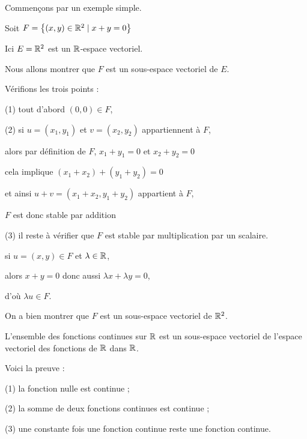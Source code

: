 \diapo

Commençons par un exemple simple.

Soit $F=\big\{(x,y)\in \mathbb{R}^2\mid x+y=0\big\}$
  
Ici $E=\mathbb{R}^2$ est un $\mathbb{R}$-espace vectoriel.

Nous allons montrer que $F$ est un sous-espace vectoriel de $E$.

\change

Vérifions les trois points :

(1) tout d'abord $(0,0) \in F$,

\change

(2) si $u=(x_1,y_1)$ et $v=(x_2,y_2)$ appartiennent à $F$, 

\change

alors par définition de $F$, $x_1+y_1=0$ et $x_2+y_2=0$ 

\change

cela implique $(x_1+x_2)+(y_1+y_2)=0$

\change

et ainsi $u+v=(x_1+x_2,y_1+y_2)$ appartient à $F$,

$F$ est donc stable par addition

\change

(3) il reste à vérifier que $F$ est stable par multiplication par un scalaire.
    
si $u=(x,y) \in F$ et $\lambda \in \mathbb{R}$, 

alors $x+y=0$ donc aussi $\lambda x + \lambda y = 0$,


    d'où $\lambda u \in F$.

    
On a bien montrer que $F$ est un sous-espace vectoriel de $\mathbb{R}^2$.


\diapo


L'ensemble des fonctions continues sur $\mathbb{R}$ est un sous-espace vectoriel 
de l'espace vectoriel des fonctions de $\mathbb{R}$ dans $\mathbb{R}$.

\change

  Voici la preuve :
  
  (1)  la fonction nulle est continue ;
  
\change
  
  (2) la somme de deux fonctions continues est continue ; 
 
\change

  (3)  une constante fois une fonction continue reste une fonction continue.
  

